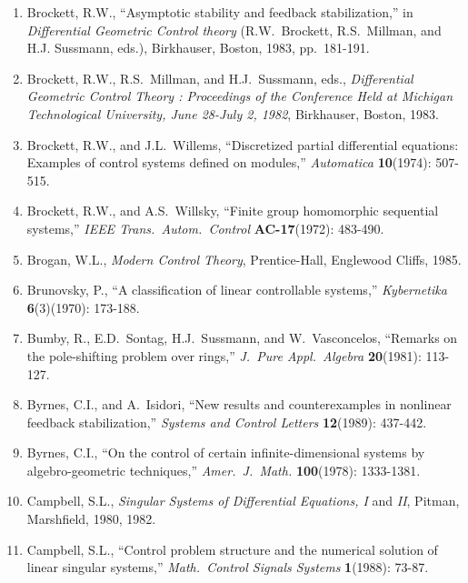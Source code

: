 \begin{enumerate}
\item
Brockett, R.W., ``Asymptotic stability and feedback stabilization,'' in {\it
Differential Geometric Control theory} (R.W.\ Brockett, R.S.\ Millman, and
H.J. Sussmann, eds.), Birkhauser, Boston, 1983, pp.\ 181-191.

\item
Brockett, R.W., R.S.\ Millman, and H.J.\ Sussmann, eds., {\it Differential
Geometric Control Theory : Proceedings of the Conference Held at Michigan
Technological University, June 28-July 2, 1982}, Birkhauser, Boston, 1983.

\item
Brockett, R.W., and J.L.\ Willems, ``Discretized partial differential
equations: Examples of control systems defined on modules,'' {\it Automatica}
{\bf 10}(1974): 507-515.

\item
Brockett, R.W., and A.S.\ Willsky, ``Finite group homomorphic sequential
systems,'' {\it IEEE Trans.\ Autom.\ Control} {\bf AC-17}(1972): 483-490.

\item
Brogan, W.L., {\it Modern Control Theory}, Prentice-Hall, Englewood Cliffs,
1985.

\item
Brunovsky, P., ``A classification of linear controllable systems,'' {\it
Kybernetika} {\bf 6}(3)(1970): 173-188.

\item
Bumby, R., E.D.\ Sontag, H.J.\ Sussmann, and W.\ Vasconcelos, ``Remarks on the
pole-shifting problem over rings,'' {\it J.\ Pure Appl.\ Algebra} {\bf
20}(1981): 113-127.

\item
Byrnes, C.I., and A.\ Isidori, ``New results and counterexamples in nonlinear
feedback stabilization,'' {\it Systems and Control Letters} {\bf 12}(1989):
437-442.

\item
Byrnes, C.I., ``On the control of certain infinite-dimensional systems by
algebro-geometric techniques,'' {\it Amer.\ J.\ Math.} {\bf 100}(1978):
1333-1381.

\item
Campbell, S.L., {\it Singular Systems of Differential Equations, I} and {\it
II}, Pitman, Marshfield, 1980, 1982.

\item
Campbell, S.L., ``Control problem structure and the numerical solution of
linear singular systems,'' {\it Math.\ Control Signals Systems} {\bf 1}(1988):
73-87.


\end{enumerate}
